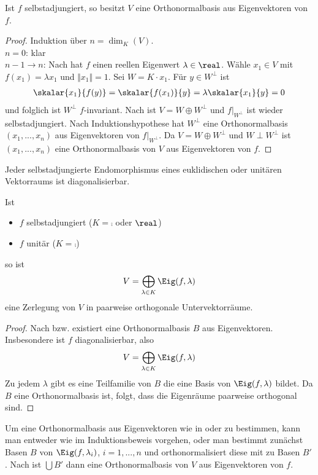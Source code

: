 \begin{theorem}
	Ist $f$ selbstadjungiert, so besitzt $V$ eine Orthonormalbasis aus Eigenvektoren von $f$.
\end{theorem}
\begin{proof}
	Induktion über $n=\dim_K(V)$. \\
	\emph{$n=0$}: klar \\
	\emph{$n-1\to n$}: Nach  hat $f$ einen reellen Eigenwert $\lambda\in\real$. Wähle $x_1\in V$ mit $f(x_1)=\lambda x_1$ und $\Vert x_1\Vert=1$. Sei $W=K\cdot x_1$. Für $y\in W^\perp$ ist 
	\begin{align}
		\skalar{x_1}{f(y)}=\skalar{f(x_1)}{y}=\lambda\skalar{x_1}{y}=0\notag
	\end{align}
	und folglich ist $W^\perp$ $f$-invariant. Nach  ist $V=W\oplus W^\perp$ und $f\vert_{W^\perp}$ ist wieder selbstadjungiert. Nach Induktionshypothese hat $W^\perp$ eine Orthonormalbasis $(x_1,...,x_n)$ aus Eigenvektoren von $f\vert_{W^\perp}$. Da $V=W\oplus W^\perp$ und $W\perp W^\perp$ ist $(x_1,...,x_n)$ eine Orthonormalbasis von $V$ aus Eigenvektoren von $f$.
\end{proof}

\begin{conclusion}
	Jeder selbstadjungierte  Endomorphismus eines euklidischen oder unitären Vektorraums ist diagonalisierbar.
\end{conclusion}

\begin{conclusion}
	Ist 
	\begin{itemize}
		\item $f$ selbstadjungiert ($K=\comp$ oder $\real$)
		\item $f$ unitär ($K=\comp$)
	\end{itemize}
	so ist 
	\begin{align}
		V=\bigoplus_{\lambda\in K} \Eig(f,\lambda)\notag
	\end{align}
	eine Zerlegung von $V$ in paarweise orthogonale Untervektorräume.
\end{conclusion}
\begin{proof}
	Nach  bzw.  existiert eine Orthonormalbasis $B$ aus Eigenvektoren. Insbesondere ist $f$ diagonalisierbar, also
	\begin{align}
		V=\bigoplus_{\lambda\in K} \Eig(f,\lambda)\notag
	\end{align}
	Zu jedem $\lambda$ gibt es eine Teilfamilie von $B$ die eine Basis von $\Eig(f,\lambda)$ bildet. Da $B$ eine Orthonormalbasis ist, folgt, dass die Eigenräume paarweise orthogonal sind.
\end{proof}

\begin{remark}
	Um eine Orthonormalbasis aus Eigenvektoren wie in  oder  zu bestimmen, kann man entweder wie im Induktionsbeweis vorgehen, oder man bestimmt zunächst Basen $B$ von $\Eig(f,\lambda_i)$, $i=1,...,n$ und orthonormalisiert diese mit  zu Basen $B'$. Nach  ist $\bigcup B'$ dann eine Orthonormalbasis von $V$ aus Eigenvektoren von $f$.
\end{remark}